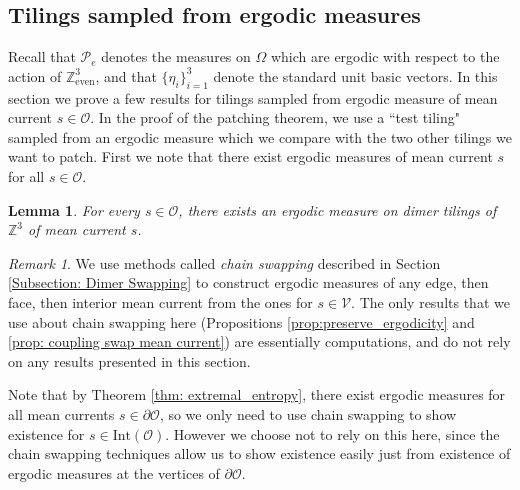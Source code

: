 \documentclass[11pt]{article}
\newtheorem{lemma}[thm]{Lemma}
\theoremstyle{remark}
\newtheorem{rem}[thm]{Remark}
\theoremstyle{definition}
\newcommand{\Z}{\mathbb{Z}}
\newcommand{\threeeven}{\Z^3_{\text{even}}}
\newcommand{\mc}[1]{\mathcal{#1}}
\newcommand{\m}[1]{\mathbb{#1}}
\begin{document}
\subsection{Tilings sampled from ergodic measures}\label{sec: ergodic}

Recall that $\mc P_e$ denotes the measures on $\Omega$ which are ergodic with respect to the action of $\threeeven$, and that $\{\eta_i\}_{i=1}^3$ denote the standard unit basic vectors. In this section we prove a few results for tilings sampled from ergodic measure of mean current $s\in \mc O$. In the proof of the patching theorem, we use a ``test tiling" sampled from an ergodic measure  which we compare with the two other tilings we want to patch. First we note that there exist ergodic measures of mean current $s$ for all $s\in \mc O$. 


\begin{lemma}\label{lem: ergodic measures exist}
    For every $s\in \mc O$, there exists an ergodic measure on dimer tilings of $\m Z^3$ of mean current $s$. 
\end{lemma}
\begin{rem}
   We use methods called \textit{chain swapping} described in Section \ref{Subsection: Dimer Swapping} to construct ergodic measures of any edge, then face, then interior mean current from the ones for $s\in \mc V$. The only results that we use about chain swapping here (Propositions \ref{prop:preserve_ergodicity} and \ref{prop: coupling swap mean current}) are essentially computations, and do not rely on any results presented in this section. 

   Note that by Theorem \ref{thm: extremal_entropy}, there exist ergodic measures for all mean currents $s\in \partial \mc O$, so we only need to use chain swapping to show existence for $s\in \text{Int}(\mc O)$. However we choose not to rely on this here, since the chain swapping techniques allow us to show existence easily just from existence of ergodic measures at the vertices of $\partial \mc O$. 
\end{rem}
\end{document}
